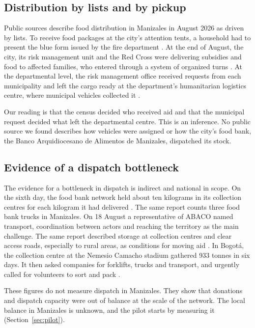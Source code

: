 \documentclass[11pt]{article}
\begin{document}
\subsection{Distribution by lists and by pickup}

Public sources describe food distribution in Manizales in August 2026 as driven by lists. To receive food packages at the city's attention tents, a household had to present the blue form issued by the fire department \citep{alcaldia2026carpas}. At the end of August, the city, its risk management unit and the Red Cross were delivering subsidies and food to affected families, who entered through a system of organized turns \citep{alcaldia2026turnos}. At the departmental level, the risk management office received requests from each municipality and left the cargo ready at the department's humanitarian logistics centre, where municipal vehicles collected it \citep{escaldas2026kits}.

Our reading is that the census decided who received aid and that the municipal request decided what left the departmental centre. This is an inference. No public source we found describes how vehicles were assigned or how the city's food bank, the Banco Arquidiocesano de Alimentos de Manizales, dispatched its stock.

\subsection{Evidence of a dispatch bottleneck}

The evidence for a bottleneck in dispatch is indirect and national in scope. On the sixth day, the food bank network held about ten kilograms in its collection centres for each kilogram it had delivered \citep{portafolio2026flypass}. The same report counts three food bank trucks in Manizales. On 18 August a representative of ABACO named transport, coordination between actors and reaching the territory as the main challenge. The same report described storage at collection centres and clear access roads, especially to rural areas, as conditions for moving aid \citep{rcn2026abaco}. In Bogotá, the collection centre at the Nemesio Camacho stadium gathered 933 tonnes in six days. It then asked companies for forklifts, trucks and transport, and urgently called for volunteers to sort and pack \citep{rcn2026campin}.

These figures do not measure dispatch in Manizales. They show that donations and dispatch capacity were out of balance at the scale of the network. The local balance in Manizales is unknown, and the pilot starts by measuring it (Section~\ref{sec:pilot}).
\end{document}
